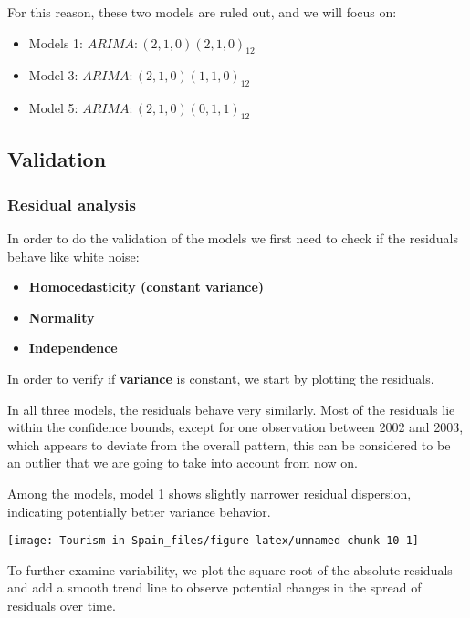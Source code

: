 \documentclass[
]{article}
\begin{document}
For this reason, these two models are ruled out, and we will focus on:

\begin{itemize}
\item
  Models 1: \textbf{\(ARIMA: (2, 1, 0)(2, 1, 0)_{12}\)}
\item
  Model 3: \textbf{\(ARIMA: (2, 1, 0)(1, 1, 0)_{12}\)}
\item
  Model 5: \textbf{\(ARIMA: (2, 1, 0)(0, 1, 1)_{12}\)}
\end{itemize}

\hypertarget{validation}{%
\subsection{Validation}\label{validation}}

\hypertarget{residual-analysis}{%
\subsubsection{Residual analysis}\label{residual-analysis}}

In order to do the validation of the models we first need to check if
the residuals behave like white noise:

\begin{itemize}
\item
  \textbf{Homocedasticity (constant variance)}
\item
  \textbf{Normality}
\item
  \textbf{Independence}
\end{itemize}

In order to verify if \textbf{variance} is constant, we start by
plotting the residuals.

In all three models, the residuals behave very similarly. Most of the
residuals lie within the confidence bounds, except for one observation
between 2002 and 2003, which appears to deviate from the overall
pattern, this can be considered to be an outlier that we are going to
take into account from now on.

Among the models, model 1 shows slightly narrower residual dispersion,
indicating potentially better variance behavior.

\begin{center}\texttt{[image: Tourism-in-Spain\_files/figure-latex/unnamed-chunk-10-1]} \end{center}

To further examine variability, we plot the square root of the absolute
residuals and add a smooth trend line to observe potential changes in
the spread of residuals over time.
\end{document}

